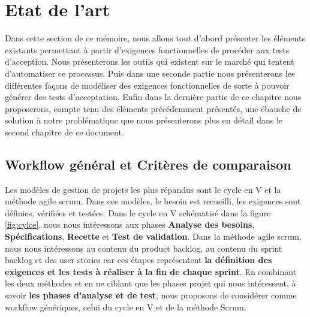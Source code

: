 \chapter{Etat de l'art}
\label{chap:premierchapitre}

Dans cette section de ce mémoire, nous allons tout d'abord présenter les éléments existants permettant à partir d'exigences fonctionnelles de procéder aux tests d'acception. Nous présenterons les outils qui existent sur le marché qui tentent d'automatiser ce processus. Puis dans une seconde partie nous présenterons les différentes façons de modéliser des exigences fonctionnelles de sorte à pouvoir générer des tests d'acceptation. Enfin dans la dernière partie de ce chapitre nous proposerons, compte tenu des éléments précédemment présentés, une ébauche de solution à notre problématique que nous présenterons plus en détail dans le second chapitre de ce document.

\section{Workflow général et Critères de comparaison}

Les modèles de gestion de projets les plus répandus sont le cycle en V et la méthode agile scrum. Dans ces modèles, le besoin est recueilli, les exigences sont définies, vérifiées et testées. Dans le cycle en V schématisé dans la figure \ref{fig:cylce}, nous nous intéressons aux phases \textbf{Analyse des besoins}, \textbf{Spécifications}, \textbf{Recette} et \textbf{Test de validation}. Dans la méthode agile scrum, nous nous intéressons au contenu du product backlog, au contenu du sprint backlog et des user stories car ces étapes représentent \textbf{la définition des exigences et les tests à réaliser à la fin de chaque sprint}. En combinant les deux méthodes et en ne ciblant que les phases projet qui nous intéressent, à savoir \textbf{les phases d'analyse et de test}, nous proposons de considérer comme workflow génériques, celui du cycle en V et de la méthode Scrum.

